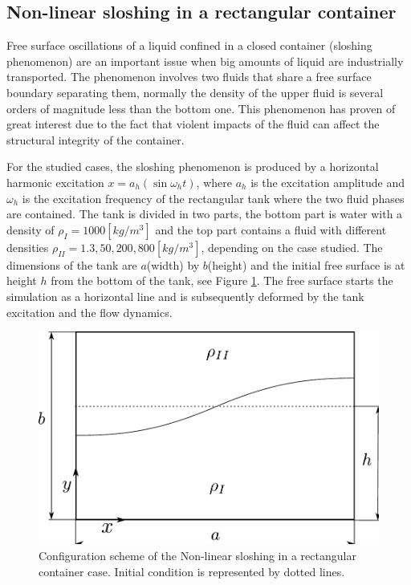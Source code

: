 \subsection{Non-linear sloshing in a rectangular container}%

Free surface oscillations of a liquid confined in a closed container (sloshing phenomenon) are an important issue when big amounts of liquid are industrially transported. The phenomenon involves two fluids that share a free surface boundary separating them, normally the density of the upper fluid is several orders of magnitude less than the bottom one. This phenomenon has proven of great interest due to the fact that violent impacts of the fluid can affect the structural integrity of the container.

For the studied cases, the sloshing phenomenon is produced by a horizontal harmonic excitation $x = a_h (\sin \omega_h t)$, where $a_h$ is the excitation amplitude and $\omega_h$ is the excitation frequency of the rectangular tank where the two fluid phases are contained. The tank is divided in two parts, the bottom part is water with a density of $\rho_{I} = 1000 [kg/m^3]$ and the top part contains a fluid
with different densities $\rho_{II} = 1.3, 50, 200, 800 [kg/m^3]$, depending on the case studied\cite{Goni13}. The dimensions of the
tank are $a$(width) by $b$(height) and the initial free surface is at height $h$ from the bottom of the tank, see Figure \ref{fg:ansari-config}. The free surface starts the simulation as a horizontal line and is subsequently deformed by the tank excitation and the flow dynamics.

\begin{figure}[H]
  \begin{center}
      \includegraphics[width=.7\columnwidth]{images/ansari_config.pdf}
  \end{center}
  \caption{\label{fg:ansari-config} Configuration scheme of the Non-linear sloshing in a rectangular container case. Initial condition is represented by dotted lines.}
\end{figure}

